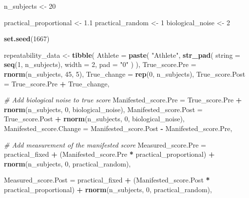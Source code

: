 \documentclass[
]{book}
\newenvironment{Shaded}{\begin{snugshade}}{\end{snugshade}}
\newcommand{\CommentTok}[1]{\textcolor[rgb]{0.56,0.35,0.01}{\textit{#1}}}
\newcommand{\DataTypeTok}[1]{\textcolor[rgb]{0.13,0.29,0.53}{#1}}
\newcommand{\DecValTok}[1]{\textcolor[rgb]{0.00,0.00,0.81}{#1}}
\newcommand{\FloatTok}[1]{\textcolor[rgb]{0.00,0.00,0.81}{#1}}
\newcommand{\KeywordTok}[1]{\textcolor[rgb]{0.13,0.29,0.53}{\textbf{#1}}}
\newcommand{\NormalTok}[1]{#1}
\newcommand{\OperatorTok}[1]{\textcolor[rgb]{0.81,0.36,0.00}{\textbf{#1}}}
\newcommand{\StringTok}[1]{\textcolor[rgb]{0.31,0.60,0.02}{#1}}
\begin{document}
\begin{Shaded}
\begin{Highlighting}[]
\NormalTok{n\_subjects <{-}}\StringTok{ }\DecValTok{20}

\NormalTok{practical\_proportional <{-}}\StringTok{ }\FloatTok{1.1}
\NormalTok{practical\_random <{-}}\StringTok{ }\DecValTok{1}
\NormalTok{biological\_noise <{-}}\StringTok{ }\DecValTok{2}

\KeywordTok{set.seed}\NormalTok{(}\DecValTok{1667}\NormalTok{)}

\NormalTok{repeatability\_data <{-}}\StringTok{ }\KeywordTok{tibble}\NormalTok{(}
  \DataTypeTok{Athlete =} \KeywordTok{paste}\NormalTok{(}
    \StringTok{"Athlete"}\NormalTok{,}
    \KeywordTok{str\_pad}\NormalTok{(}
      \DataTypeTok{string =} \KeywordTok{seq}\NormalTok{(}\DecValTok{1}\NormalTok{, n\_subjects),}
      \DataTypeTok{width =} \DecValTok{2}\NormalTok{,}
      \DataTypeTok{pad =} \StringTok{"0"}
\NormalTok{    )}
\NormalTok{  ),}
  \DataTypeTok{True\_score.Pre =} \KeywordTok{rnorm}\NormalTok{(n\_subjects, }\DecValTok{45}\NormalTok{, }\DecValTok{5}\NormalTok{),}
  \DataTypeTok{True\_change =} \KeywordTok{rep}\NormalTok{(}\DecValTok{0}\NormalTok{, n\_subjects),}
  \DataTypeTok{True\_score.Post =}\NormalTok{ True\_score.Pre }\OperatorTok{+}\StringTok{ }\NormalTok{True\_change,}
  
  \CommentTok{\# Add biological noise to true score}
  \DataTypeTok{Manifested\_score.Pre =}\NormalTok{ True\_score.Pre }\OperatorTok{+}\StringTok{ }\KeywordTok{rnorm}\NormalTok{(n\_subjects, }\DecValTok{0}\NormalTok{, biological\_noise),}
  \DataTypeTok{Manifested\_score.Post =}\NormalTok{ True\_score.Post }\OperatorTok{+}\StringTok{ }\KeywordTok{rnorm}\NormalTok{(n\_subjects, }\DecValTok{0}\NormalTok{, biological\_noise),}
  \DataTypeTok{Manifested\_score.Change =}\NormalTok{ Manifested\_score.Post }\OperatorTok{{-}}\StringTok{ }\NormalTok{Manifested\_score.Pre,}

  \CommentTok{\# Add measurement of the manifested score}
  \DataTypeTok{Measured\_score.Pre =}\NormalTok{ practical\_fixed }\OperatorTok{+}\StringTok{ }
\StringTok{    }\NormalTok{(Manifested\_score.Pre }\OperatorTok{*}\StringTok{ }\NormalTok{practical\_proportional) }\OperatorTok{+}
\StringTok{    }\KeywordTok{rnorm}\NormalTok{(n\_subjects, }\DecValTok{0}\NormalTok{, practical\_random),}
  
  \DataTypeTok{Measured\_score.Post =}\NormalTok{ practical\_fixed }\OperatorTok{+}
\StringTok{    }\NormalTok{(Manifested\_score.Post }\OperatorTok{*}\StringTok{ }\NormalTok{practical\_proportional) }\OperatorTok{+}\StringTok{ }
\StringTok{    }\KeywordTok{rnorm}\NormalTok{(n\_subjects, }\DecValTok{0}\NormalTok{, practical\_random),}
  

\end{Highlighting}
\end{Shaded}
\end{document}
